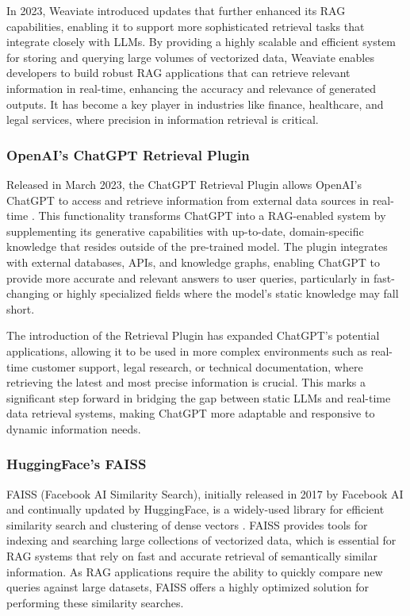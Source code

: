 In 2023, Weaviate introduced updates that further enhanced its RAG capabilities, enabling it to support more sophisticated retrieval tasks that integrate closely with LLMs. 
By providing a highly scalable and efficient system for storing and querying large volumes of vectorized data, Weaviate enables developers to build robust RAG applications that can retrieve relevant information in real-time, enhancing the accuracy and relevance of generated outputs. 
It has become a key player in industries like finance, healthcare, and legal services, where precision in information retrieval is critical.

\subsubsection{OpenAI's ChatGPT Retrieval Plugin}

Released in March 2023, the ChatGPT Retrieval Plugin allows OpenAI's ChatGPT to access and retrieve information from external data sources in real-time \cite{ChatGPTRetrievalPlugin}. 
This functionality transforms ChatGPT into a RAG-enabled system by supplementing its generative capabilities with up-to-date, domain-specific knowledge that resides outside of the pre-trained model. 
The plugin integrates with external databases, APIs, and knowledge graphs, enabling ChatGPT to provide more accurate and relevant answers to user queries, particularly in fast-changing or highly specialized fields where the model's static knowledge may fall short.

The introduction of the Retrieval Plugin has expanded ChatGPT's potential applications, allowing it to be used in more complex environments such as real-time customer support, legal research, or technical documentation, where retrieving the latest and most precise information is crucial. 
This marks a significant step forward in bridging the gap between static LLMs and real-time data retrieval systems, making ChatGPT more adaptable and responsive to dynamic information needs.

\subsubsection{HuggingFace's FAISS}

FAISS (Facebook AI Similarity Search), initially released in 2017 by Facebook AI and continually updated by HuggingFace, is a widely-used library for efficient similarity search and clustering of dense vectors \cite{FAISS}. 
FAISS provides tools for indexing and searching large collections of vectorized data, which is essential for RAG systems that rely on fast and accurate retrieval of semantically similar information. 
As RAG applications require the ability to quickly compare new queries against large datasets, FAISS offers a highly optimized solution for performing these similarity searches.

